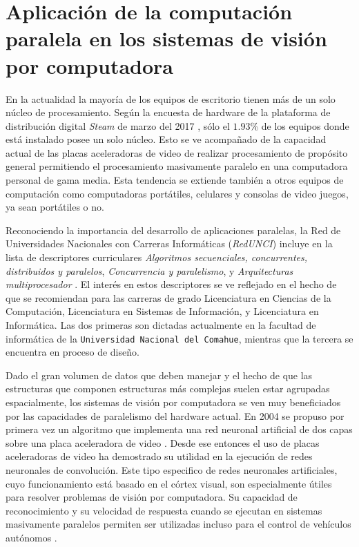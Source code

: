 
\section{Aplicación de la computación paralela en los sistemas de visión por computadora}

\label{algoritmosParalelosYVision}

En la actualidad la mayoría de los equipos de escritorio tienen más de un solo
núcleo de procesamiento. Según la encuesta de hardware de la plataforma de
distribución digital \emph{Steam} de marzo del 2017 \cite{steamSurvey}, sólo
el $1.93$\% de los equipos donde está instalado posee un solo núcleo. Esto se
ve acompañado de la capacidad actual de las placas aceleradoras de video de
realizar procesamiento de propósito general permitiendo el procesamiento
masivamente paralelo en una computadora personal de gama media. Esta tendencia
se extiende también a otros equipos de computación como computadoras
portátiles, celulares y consolas de video juegos, ya sean portátiles o no.

Reconociendo la importancia del desarrollo de aplicaciones paralelas, la Red
de Universidades Nacionales con Carreras Informáticas (\emph{RedUNCI}) incluye
en la lista de descriptores curriculares \emph{Algoritmos secuenciales,
concurrentes, distribuidos y paralelos}, \emph{Concurrencia y paralelismo}, y
\emph{Arquitecturas multiprocesador} \cite{RedUNCI2015}. El interés en estos
descriptores se ve reflejado en el hecho de que se recomiendan para las
carreras de grado Licenciatura en Ciencias de la Computación, Licenciatura en
Sistemas de Información, y Licenciatura en Informática. Las dos primeras son
dictadas actualmente en la facultad de informática de la \texttt{Universidad
Nacional del Comahue}, mientras que la tercera se encuentra en proceso de
diseño.

Dado el gran volumen de datos que deben manejar y el hecho de que las
estructuras que componen estructuras más complejas suelen estar agrupadas
espacialmente, los sistemas de visión por computadora se ven muy beneficiados
por las capacidades de paralelismo del hardware actual. En 2004 se propuso por
primera vez un algoritmo que implementa una red neuronal artificial de dos capas
sobre una placa aceleradora de video \cite{GPUforMLA}. Desde ese entonces el uso
de placas aceleradoras de video ha demostrado su utilidad en la ejecución de
redes neuronales de convolución. Este tipo especifico de redes neuronales
artificiales, cuyo funcionamiento está basado en el córtex visual, son
especialmente útiles para resolver problemas de visión por computadora. Su
capacidad de reconocimiento y su velocidad de respuesta cuando se ejecutan en
sistemas masivamente paralelos permiten ser utilizadas incluso para el control
de vehículos autónomos \cite{e2eLearning4SDC}.

